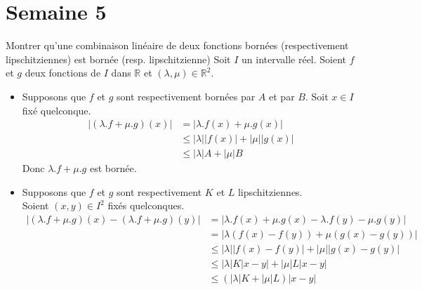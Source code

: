 \documentclass{article}
\renewenvironment{question_kholle}[2][ ]
{
	\subsection{\texorpdfstring{#2}{}}
	\notblank{#1}
	{
		\noindent #1
		\bigbreak
	}
	{}
	\begin{proof}
}
{
	\end{proof}
}
\begin{document}
\pagebreak\section{Semaine 5}

\begin{question_kholle}{Montrer qu'une combinaison linéaire de deux fonctions bornées (respectivement lipschitziennes) est bornée (resp. lipschitzienne)}
	Soit $I$ un intervalle réel.
	Soient $f$ et $g$ deux fonctions de $I$ dans $\mathbb{R}$ et $(\lambda, \mu) \in \mathbb{R}^2$.
	\begin{itemize}[label=$\lozenge$]
		\item Supposons que $f$ et $g$ sont respectivement bornées par $A$ et par $B$.
		      Soit $x \in I$ fixé quelconque.
		      \begin{align*}
			      \Big| (\lambda.f + \mu.g)(x) \Big| & = \Big| \lambda.f(x) + \mu.g(x) \Big|                                             \\
			                                         & \leqslant \big| \lambda \big|  \big|f(x)\big| + \big| \mu \big|  \big| g(x) \big| \\
			                                         & \leqslant \big| \lambda \big| A + \big| \mu \big| B
		      \end{align*}
		      Donc $\lambda.f + \mu.g$ est bornée.
		\item Supposons que $f$ et $g$ sont respectivement $K$ et $L$ lipschitziennes.\\
		      Soient $(x, y) \in I^2$ fixés quelconques.
		      \begin{align*}
			      \Big| (\lambda.f + \mu.g)(x) - (\lambda.f + \mu.g)(y)\Big| & = \Big| \lambda.f(x) + \mu.g(x) - \lambda.f(y) - \mu.g(y) \Big|                                   \\
			                                                                 & = \Big| \lambda(f(x) - f(y)) + \mu(g(x) - g(y)) \Big|                                             \\
			                                                                 & \leqslant \Big| \lambda  \Big|  \Big| f(x) - f(y) \Big| + \Big| \mu \Big|  \Big|g(x) - g(y) \Big| \\
			                                                                 & \leqslant \Big| \lambda  \Big|  K \Big| x-y \Big| + \Big| \mu  \Big| L  \Big| x - y \Big|         \\
			                                                                 & \leqslant (|\lambda| K + |\mu|L ) |x - y|
		      \end{align*}
	\end{itemize}
\end{question_kholle}
\end{document}
